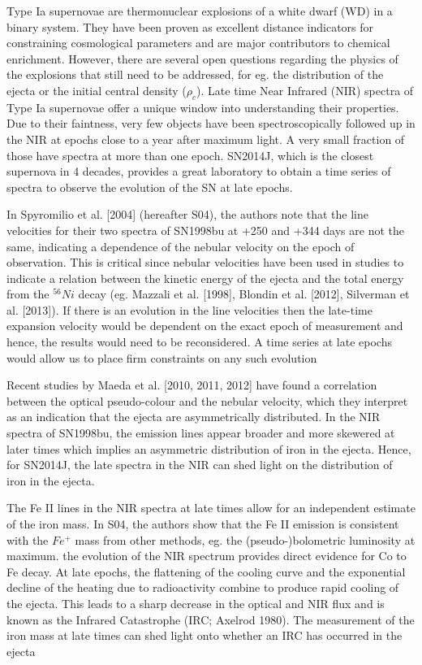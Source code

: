 \documentclass[11pt]{article}
\begin{document}
\sciencejustification    %
Type Ia supernovae are thermonuclear explosions of a white dwarf (WD) in a binary system. They have been proven as excellent distance indicators for constraining cosmological parameters and are major contributors to chemical enrichment. However, there are several open questions regarding the physics of the explosions that still need to be addressed, for eg. the distribution of the ejecta or the initial central density ($\rho_c$). 
Late time Near Infrared (NIR) spectra of Type Ia supernovae offer a unique window into understanding their properties. Due to their faintness, very few objects have been spectroscopically followed up in the NIR at epochs close to a year after maximum light. A very small fraction of those have spectra at more than one epoch.
SN2014J, which is the closest supernova in 4 decades, provides a great laboratory to obtain a time series of spectra to observe the evolution of the SN at late epochs.

In Spyromilio et al. [2004] (hereafter S04), the authors note that the line velocities for their two spectra of SN1998bu at +250 and +344 days are not the same, indicating a dependence of the nebular velocity on the epoch of observation. This is critical since nebular velocities have been used in studies to indicate a relation between the kinetic energy of the ejecta and the total energy from the $^{56} Ni$ decay (eg. Mazzali et al. [1998], Blondin et al. [2012], Silverman et al. [2013]). If there is an evolution in the line velocities then the late-time expansion velocity would be dependent on the exact epoch of measurement and hence, the results would need to be reconsidered. A time series at late epochs would allow us to place firm constraints on any such evolution

Recent studies by Maeda et al. [2010, 2011, 2012] have found a correlation between the optical pseudo-colour and the nebular velocity, which they interpret as an indication that the ejecta are asymmetrically distributed. In the NIR spectra of SN1998bu, the emission lines appear broader and more skewered at later times which implies an asymmetric distribution of iron in the ejecta. Hence, for SN2014J, the late spectra in the NIR can shed light on the distribution of iron in the ejecta. 

The Fe II lines in the NIR spectra at late times allow for an independent estimate of the iron mass. In S04, the authors show that the Fe II emission is consistent with the $Fe^{+}$  mass from other methods, eg. the (pseudo-)bolometric luminosity at maximum.
the evolution of the NIR spectrum provides  direct evidence for Co to Fe decay. 
 At late epochs, the flattening of the cooling curve and the exponential decline of the heating due to radioactivity combine to produce rapid cooling of the ejecta. This leads to a sharp decrease in the optical and NIR flux and is known as the Infrared Catastrophe (IRC; Axelrod 1980). The measurement of the iron mass at late times can shed light onto whether an IRC has occurred in the ejecta 
\end{document}
